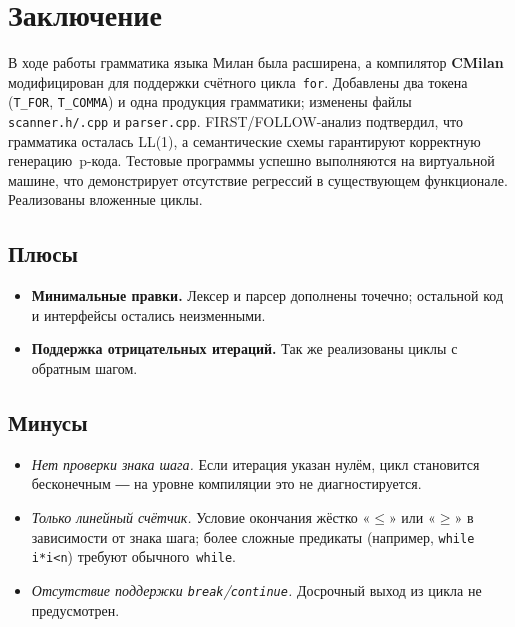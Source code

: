 \documentclass[areasetadvanced]{scrartcl}
\begin{document}
    \section*{Заключение}
    
    В ходе работы грамматика языка Милан была расширена,
    а компилятор \textbf{CMilan} модифицирован для поддержки счётного
    цикла~\texttt{for}.  
    Добавлены два токена (\texttt{T\_FOR}, \texttt{T\_COMMA}) и
    одна продукция грамматики; изменены файлы
    \lstinline{scanner.h/.cpp} и \lstinline{parser.cpp}.
    FIRST/FOLLOW-анализ подтвердил, что грамматика осталась LL(1),
    а семантические схемы гарантируют корректную генерацию~p-кода.
    Тестовые программы успешно выполняются на виртуальной машине,
    что демонстрирует отсутствие регрессий в существующем функционале.
    Реализованы вложенные циклы. 
    
    \subsection*{Плюсы}
    \begin{itemize}
      \item \textbf{Минимальные правки.}  Лексер и парсер дополнены точечно;
            остальной код и интерфейсы остались неизменными.
      \item \textbf{Поддержка отрицательных итераций.} Так же реализованы циклы с обратным шагом.
    \end{itemize}
    
    \subsection*{Минусы}
    \begin{itemize}
      \item \emph{Нет проверки знака шага.}  Если итерация указан нулём,
            цикл становится бесконечным ― на уровне компиляции это
            не диагностируется.
      \item \emph{Только линейный счётчик.}  Условие окончания жёстко
            «$\le$» или «$\ge$» в зависимости от знака шага; более
            сложные предикаты (например, \texttt{while i*i<n}) требуют
            обычного~\texttt{while}.
      \item \emph{Отсутствие поддержки \texttt{break}/\texttt{continue}.}
            Досрочный выход из цикла не предусмотрен.
    \end{itemize}
    
\end{document}
